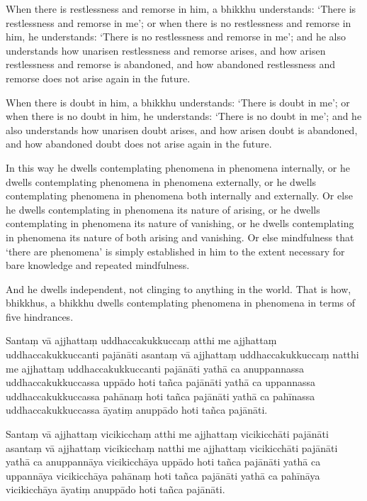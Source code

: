 \englishPage

When there is restlessness and remorse in him, a bhikkhu understands:
`There is restlessness and remorse in me';
or when there is no restlessness and remorse in him, he understands:
`There is no restlessness and remorse in me';
and he also understands how unarisen restlessness and remorse arises,
and how arisen restlessness and remorse is abandoned,
and how abandoned restlessness and remorse does not arise again in the future.

When there is doubt in him, a bhikkhu understands:
`There is doubt in me';
or when there is no doubt in him, he understands:
`There is no doubt in me';
and he also understands how unarisen doubt arises,
and how arisen doubt is abandoned,
and how abandoned doubt does not arise again in the future.

In this way he dwells contemplating phenomena in phenomena internally, or he
dwells contemplating phenomena in phenomena externally, or he dwells
contemplating phenomena in phenomena both internally and externally. Or else he
dwells contemplating in phenomena its nature of arising, or he dwells
contemplating in phenomena its nature of vanishing, or he dwells contemplating
in phenomena its nature of both arising and vanishing. Or else mindfulness that
‘there are phenomena’ is simply established in him to the extent necessary for
bare knowledge and repeated mindfulness.

And he dwells independent, not clinging to anything in the world. That is how,
bhikkhus, a bhikkhu dwells contemplating phenomena in phenomena in terms of five
hindrances.


\paliPage

Santaṃ vā ajjhattaṃ uddhaccakukkuccaṃ atthi me ajjhattaṃ uddhaccakukkuccanti pajānāti
asantaṃ vā ajjhattaṃ uddhaccakukkuccaṃ natthi me ajjhattaṃ uddhaccakukkuccanti pajānāti
yathā ca anuppannassa uddhaccakukkuccassa uppādo hoti tañca pajānāti
yathā ca uppannassa uddhaccakukkuccassa pahānaṃ hoti tañca pajānāti
yathā ca pahīnassa uddhaccakukkuccassa āyatiṃ anuppādo hoti tañca pajānāti.

Santaṃ vā ajjhattaṃ vicikicchaṃ atthi me ajjhattaṃ vicikicchāti pajānāti
asantaṃ vā ajjhattaṃ vicikicchaṃ natthi me ajjhattaṃ vicikicchāti pajānāti
yathā ca anuppannāya vicikicchāya uppādo hoti tañca pajānāti
yathā ca uppannāya vicikicchāya pahānaṃ hoti tañca pajānāti
yathā ca pahīnāya vicikicchāya āyatiṃ anuppādo hoti tañca pajānāti.

